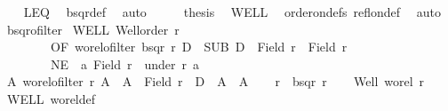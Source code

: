 \begin{isabellebody}
\ \ \isamarkupfalse%
\ LEQ\ \isamarkupfalse%
\ bsqr{\isacharunderscore}{\kern0pt}def\ \isamarkupfalse%
\ auto\isanewline
\ \ \isamarkupfalse%
\ \isamarkupfalse%
\ {\isacharquery}{\kern0pt}thesis\ \isamarkupfalse%
\ WELL\ \isamarkupfalse%
\ order{\isacharunderscore}{\kern0pt}on{\isacharunderscore}{\kern0pt}defs\ refl{\isacharunderscore}{\kern0pt}on{\isacharunderscore}{\kern0pt}def\ \isamarkupfalse%
\ auto\isanewline
{}\isamarkupfalse%
%
\endisatagproof
{\isafoldproof}%
%
\isadelimproof
\isanewline
%
\endisadelimproof
\isanewline
{}\isamarkupfalse%
\ bsqr{\isacharunderscore}{\kern0pt}ofilter{\isacharcolon}{\kern0pt}\isanewline
{}\ WELL{\isacharcolon}{\kern0pt}\ {\isachardoublequoteopen}Well{\isacharunderscore}{\kern0pt}order\ r{\isachardoublequoteclose}\ \isanewline
\ \ \ \ \ \ \ \ OF{\isacharcolon}{\kern0pt}\ {\isachardoublequoteopen}wo{\isacharunderscore}{\kern0pt}rel{\isachardot}{\kern0pt}ofilter\ {\isacharparenleft}{\kern0pt}bsqr\ r{\isacharparenright}{\kern0pt}\ D{\isachardoublequoteclose}\ \ SUB{\isacharcolon}{\kern0pt}\ {\isachardoublequoteopen}D\ {\isacharless}{\kern0pt}\ Field\ r\ {\isasymtimes}\ Field\ r{\isachardoublequoteclose}\ \isanewline
\ \ \ \ \ \ \ \ NE{\isacharcolon}{\kern0pt}\ {\isachardoublequoteopen}{\isasymnot}\ {\isacharparenleft}{\kern0pt}{\isasymexists}a{\isachardot}{\kern0pt}\ Field\ r\ {\isacharequal}{\kern0pt}\ under\ r\ a{\isacharparenright}{\kern0pt}{\isachardoublequoteclose}\isanewline
{}\ {\isachardoublequoteopen}{\isasymexists}A{\isachardot}{\kern0pt}\ wo{\isacharunderscore}{\kern0pt}rel{\isachardot}{\kern0pt}ofilter\ r\ A\ {\isasymand}\ A\ {\isacharless}{\kern0pt}\ Field\ r\ {\isasymand}\ D\ {\isasymle}\ A\ {\isasymtimes}\ A{\isachardoublequoteclose}\isanewline
%
\isadelimproof
%
\endisadelimproof
%
\isatagproof
{}\isamarkupfalse%
{\isacharminus}{\kern0pt}\isanewline
\ \ \isamarkupfalse%
\ {\isacharquery}{\kern0pt}r{\isacharprime}{\kern0pt}\ {\isacharequal}{\kern0pt}\ {\isachardoublequoteopen}bsqr\ r{\isachardoublequoteclose}\isanewline
\ \ \isamarkupfalse%
\ Well{\isacharcolon}{\kern0pt}\ {\isachardoublequoteopen}wo{\isacharunderscore}{\kern0pt}rel\ r{\isachardoublequoteclose}\ \isamarkupfalse%
\ WELL\ wo{\isacharunderscore}{\kern0pt}rel{\isacharunderscore}{\kern0pt}def\ \isamarkupfalse%

\end{isabellebody}

